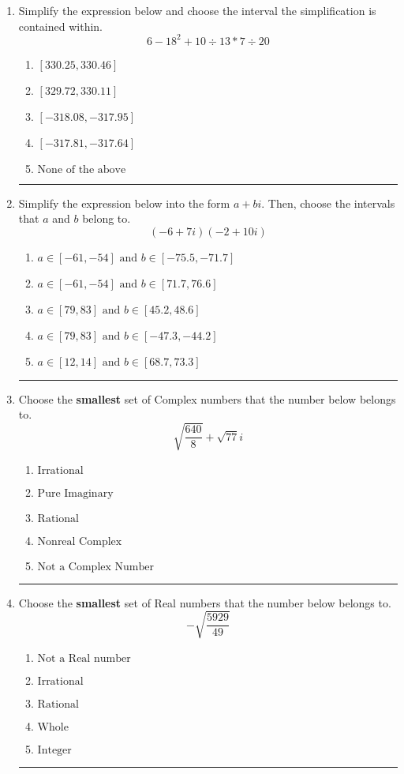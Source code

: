 \documentclass[14pt]{extbook}
\newcommand{\litem}[1]{\item#1\hspace*{-1cm}\rule{\textwidth}{0.4pt}}
\begin{document}
\begin{enumerate}
\litem{
Simplify the expression below and choose the interval the simplification is contained within.\[ 6 - 18^2 + 10 \div 13 * 7 \div 20 \]\begin{enumerate}[label=\Alph*.]
\item \( [330.25, 330.46] \)
\item \( [329.72, 330.11] \)
\item \( [-318.08, -317.95] \)
\item \( [-317.81, -317.64] \)
\item \( \text{None of the above} \)

\end{enumerate} }
\litem{
Simplify the expression below into the form $a+bi$. Then, choose the intervals that $a$ and $b$ belong to.\[ (-6 + 7 i)(-2 + 10 i) \]\begin{enumerate}[label=\Alph*.]
\item \( a \in [-61, -54] \text{ and } b \in [-75.5, -71.7] \)
\item \( a \in [-61, -54] \text{ and } b \in [71.7, 76.6] \)
\item \( a \in [79, 83] \text{ and } b \in [45.2, 48.6] \)
\item \( a \in [79, 83] \text{ and } b \in [-47.3, -44.2] \)
\item \( a \in [12, 14] \text{ and } b \in [68.7, 73.3] \)

\end{enumerate} }
\litem{
Choose the \textbf{smallest} set of Complex numbers that the number below belongs to.\[ \sqrt{\frac{640}{8}}+\sqrt{77} i \]\begin{enumerate}[label=\Alph*.]
\item \( \text{Irrational} \)
\item \( \text{Pure Imaginary} \)
\item \( \text{Rational} \)
\item \( \text{Nonreal Complex} \)
\item \( \text{Not a Complex Number} \)

\end{enumerate} }
\litem{
Choose the \textbf{smallest} set of Real numbers that the number below belongs to.\[ -\sqrt{\frac{5929}{49}} \]\begin{enumerate}[label=\Alph*.]
\item \( \text{Not a Real number} \)
\item \( \text{Irrational} \)
\item \( \text{Rational} \)
\item \( \text{Whole} \)
\item \( \text{Integer} \)


\end{enumerate}}
\end{enumerate}
\end{document}
